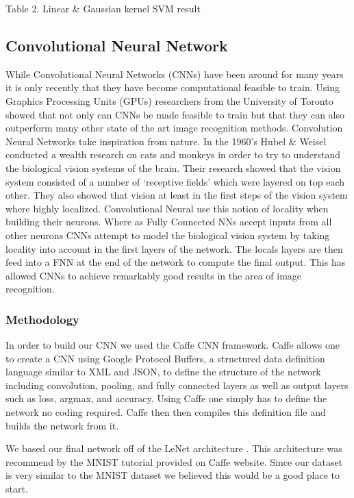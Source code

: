 \documentclass[10pt,twocolumn]{article}
\begin{document}
Table 2. Linear \& Gaussian kernel SVM result
\\

\subsection{Convolutional Neural Network}
While Convolutional Neural Networks (CNNs) have been around for many years it is only recently that they have become computational feasible to train. Using Graphics Processing Units (GPUs) researchers from the University of Toronto showed that not only can CNNs be made feasible to train but that they can also outperform many other state of the art image recognition methods\cite{imagenet}.
Convolution Neural Networks take inspiration from nature. In the 1960's Hubel \& Weisel conducted a wealth research on cats and monkeys in order to try to understand the biological vision systems of the brain. Their research showed that the vision system consisted of a number of `receptive fields' which were layered on top each other. They also showed that vision at least in the first steps of the vision system where highly localized. Convolutional Neural use this notion of locality when building their neurons. Where as Fully Connected NNs accept inputs from all other neurons CNNs attempt to model the biological vision system by taking locality into account in the first layers of the network. The locals layers are then feed into a FNN at the end of the network to compute the final output. This has allowed CNNs to achieve remarkably good results in the area of image recognition. 
\subsubsection{Methodology}
In order to build our CNN we used the Caffe CNN framework\cite{jia2014caffe}. Caffe allows one to create a CNN using Google Protocol Buffers, a structured data definition language similar to XML and JSON, to define the structure of the network including convolution, pooling, and fully connected layers as well as output layers such as loss, argmax, and accuracy. Using Caffe one simply has to define the network no coding required. Caffe then then compiles this definition file and builds the network from it.

We based our final network off of the LeNet architecture \cite{lecun-01a}. This architecture was recommend by the MNIST tutorial provided on Caffe website. Since our dataset is very similar to the MNIST dataset we believed this would be a good place to start. 
\end{document}
